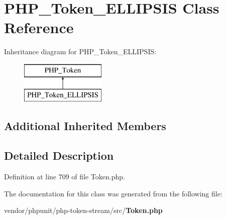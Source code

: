 \section{P\+H\+P\+\_\+\+Token\+\_\+\+E\+L\+L\+I\+P\+S\+I\+S Class Reference}
\label{class_p_h_p___token___e_l_l_i_p_s_i_s}
Inheritance diagram for P\+H\+P\+\_\+\+Token\+\_\+\+E\+L\+L\+I\+P\+S\+I\+S\+:\begin{figure}[H]
\begin{center}
\leavevmode
\includegraphics[height=2.000000cm]{class_p_h_p___token___e_l_l_i_p_s_i_s}
\end{center}
\end{figure}
\subsection*{Additional Inherited Members}


\subsection{Detailed Description}


Definition at line 709 of file Token.\+php.



The documentation for this class was generated from the following file\+:\begin{DoxyCompactItemize}
\item 
vendor/phpunit/php-\/token-\/stream/src/{\bf Token.\+php}\end{DoxyCompactItemize}
